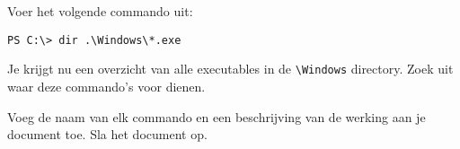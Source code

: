 Voer het volgende commando uit:
\begin{lstlisting}[style=DOS]
PS C:\> dir .\Windows\*.exe
\end{lstlisting}
Je krijgt nu een overzicht van alle executables in de \texttt{\textbackslash Windows} directory. Zoek uit waar deze commando's voor dienen.

Voeg de naam van elk commando en een beschrijving van de werking aan je document toe. Sla het document op.

